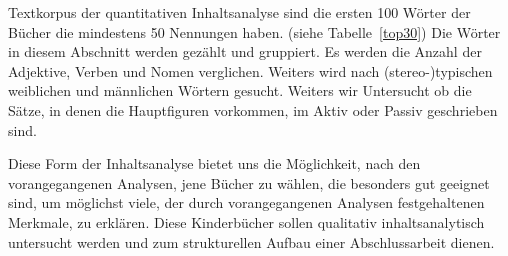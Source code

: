 
    Textkorpus der quantitativen Inhaltsanalyse sind die ersten 100 Wörter der
    Bücher die mindestens 50 Nennungen haben. (siehe Tabelle~\ref{top30}) Die
    Wörter in diesem Abschnitt werden gezählt und gruppiert. Es werden die
    Anzahl der Adjektive, Verben und Nomen verglichen. Weiters wird nach
    (stereo-)typischen weiblichen und männlichen Wörtern gesucht. Weiters wir
    Untersucht ob die Sätze, in denen die Hauptfiguren vorkommen, im Aktiv oder
    Passiv geschrieben sind.


    Diese Form der Inhaltsanalyse bietet uns die Möglichkeit, nach den
    vorangegangenen Analysen, jene Bücher zu wählen, die besonders gut geeignet
    sind, um möglichst viele, der durch vorangegangenen Analysen festgehaltenen
    Merkmale, zu erklären. Diese Kinderbücher sollen qualitativ
    inhaltsanalytisch untersucht werden und zum strukturellen Aufbau einer
    Abschlussarbeit dienen.






